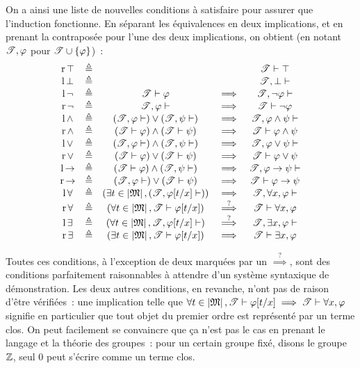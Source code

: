 On a ainsi une liste de nouvelles conditions à satisfaire pour assurer que
l'induction fonctionne. En séparant les équivalences en deux implications, et
en prenant la contraposée pour l'une des deux implications, on
obtient (en notant $\mathscr T, \varphi$ pour $\mathscr T \cup \{\varphi\}$)~:
\[\begin{array}{ccccc}
\operatorname{r}\mathord{\top} & \triangleq & & & \mathscr T\vdash\top \\
\operatorname{l}\mathord{\bot} & \triangleq & & & \mathscr T,\bot\vdash\\
\operatorname{l}\mathord{\lnot} & \triangleq & \mathscr T \vdash \varphi & \implies & \mathscr T, \lnot \varphi \vdash \\
\operatorname{r}\mathord{\lnot} & \triangleq & \mathscr T, \varphi \vdash & \implies & \mathscr T \vdash \lnot \varphi \\
\operatorname{l}\mathord{\land} & \triangleq & (\mathscr T, \varphi \vdash) \lor (\mathscr T, \psi \vdash)
& \implies & \mathscr T, \varphi \land \psi\vdash \\
\operatorname{r}\mathord{\land} & \triangleq & (\mathscr T \vdash \varphi) \land (\mathscr T \vdash \psi)
& \implies & \mathscr T \vdash \varphi \land \psi \\
\operatorname{l}\mathord{\lor} & \triangleq & (\mathscr T, \varphi \vdash) \land (\mathscr T, \psi \vdash)
& \implies & \mathscr T, \varphi \lor \psi \vdash \\
\operatorname{r}\mathord{\lor} & \triangleq & (\mathscr T \vdash \varphi) \lor (\mathscr T \vdash \psi)
& \implies & \mathscr T \vdash \varphi \lor \psi \\
\operatorname{l}\mathord{\to} & \triangleq & (\mathscr T \vdash \varphi) \land (\mathscr T, \psi \vdash)
& \implies & \mathscr T, \varphi \to \psi \vdash \\
\operatorname{r}\mathord{\to} & \triangleq & (\mathscr T,\varphi \vdash) \lor (\mathscr T \vdash \psi)
& \implies & \mathscr T \vdash \varphi \to \psi \\
\operatorname{l}\mathord{\forall} & \triangleq & (\exists t \in \left\vert \mathfrak{M}\right\vert, (\mathscr T, \varphi[t/x] \vdash))
& \implies & \mathscr T, \forall x, \varphi \vdash \\
\operatorname{r}\mathord{\forall} & \triangleq & (\forall t \in \left\vert \mathfrak{M}\right\vert, \mathscr T \vdash \varphi [t/x])
& \overset{\text{?}}{\implies} & \mathscr T \vdash \forall x, \varphi \\
\operatorname{l}\mathord{\exists} & \triangleq & (\forall t \in \left\vert \mathfrak{M}\right\vert, \mathscr T, \varphi[t/x] \vdash)
& \overset{\text{?}}{\implies} & \mathscr T, \exists x, \varphi \vdash \\
\operatorname{r}\mathord{\exists} & \triangleq & (\exists t \in \left\vert \mathfrak{M}\right\vert, \mathscr T \vdash \varphi[t/x])
& \implies & \mathscr T \vdash \exists x, \varphi
\end{array}\]

Toutes ces conditions, à l'exception de deux marquées par un
$\overset{\text{?}}{\implies}$, sont des conditions parfaitement raisonnables à
attendre d'un système syntaxique de démonstration. Les deux autres conditions,
en revanche, n'ont pas de raison d'être vérifiées~: une implication telle que
$\forall t\in\left\vert \mathfrak{M}\right\vert,\mathscr T\vdash\varphi[t/x]\implies\mathscr T\vdash\forall x,\varphi$
signifie en particulier que tout objet du premier ordre est représenté par un
terme clos. On peut facilement se convaincre que ça n'est pas le cas en prenant
le langage et la théorie des groupes~: pour un certain groupe fixé, disons le
groupe $\mathbb Z$, seul $0$ peut s'écrire comme un terme clos.

